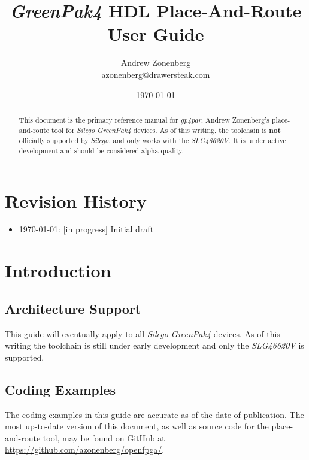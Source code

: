 \documentclass[11pt]{article}
\renewcommand\emph\textbf
\newcommand{\namestyle}[1]{\textit{#1}}
\begin{document}
\title{\vspace*{\fill}\namestyle{GreenPak4} HDL Place-And-Route User Guide}
\author{Andrew Zonenberg\\
azonenberg@drawersteak.com}
\date{\today}

\maketitle
\begin{abstract}
\normalsize This document is the primary reference manual for \namestyle{gp4par}, Andrew Zonenberg's place-and-route tool for \namestyle{Silego GreenPak4} devices. As of this writing, the toolchain is \emph{not} officially supported by \namestyle{Silego}, and only works with the
\namestyle{SLG46620V}. It is under active development and should be considered alpha quality.\vspace*{\fill}
\end{abstract}
\thispagestyle{empty}

\pagebreak

\tableofcontents

\pagebreak
\section{Revision History}
\begin{itemize}
\item \today: [in progress] Initial draft
\end{itemize}

\pagebreak
\section{Introduction}

\subsection{Architecture Support}
This guide will eventually apply to all \namestyle{Silego GreenPak4} devices. As of this writing the toolchain is still under early
development and only the \namestyle{SLG46620V} is supported.

\subsection{Coding Examples}
The coding examples in this guide are accurate as of the date of publication. The most up-to-date version of this
document, as well as source code for the place-and-route tool, may be found on GitHub at
\mbox{\url{https://github.com/azonenberg/openfpga/}}.
\end{document}
